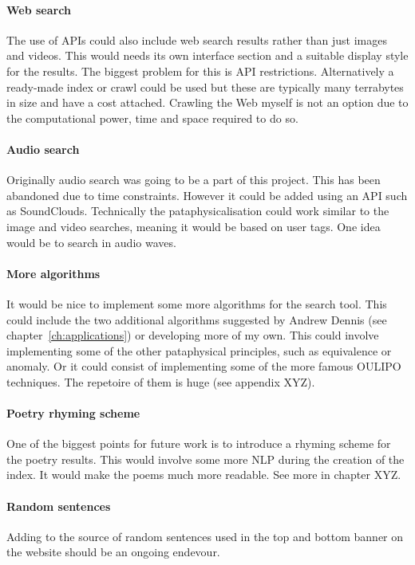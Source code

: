 \paragraph{Web search} 
The use of \ac{API}s could also include web search results rather than just images and videos. This would needs its own interface section and a suitable display style for the results. The biggest problem for this is \ac{API} restrictions. Alternatively a ready-made index or crawl could be used but these are typically many terrabytes in size and have a cost attached. Crawling the Web myself is not an option due to the computational power, time and space required to do so.

\paragraph{Audio search} 
Originally audio search was going to be a part of this project. This has been abandoned due to time constraints. However it could be added using an \ac{API} such as SoundClouds. Technically the pataphysicalisation could work similar to the image and video searches, meaning it would be based on user tags. One idea would be to search in audio waves.

\paragraph{More algorithms} 
It would be nice to implement some more algorithms for the search tool. This could include the two additional algorithms suggested by Andrew Dennis (see chapter~\ref{ch:applications}) or developing more of my own. This could involve implementing some of the other pataphysical principles, such as equivalence or anomaly. Or it could consist of implementing some of the more famous \ac{OULIPO} techniques. The repetoire of them is huge (see appendix XYZ).

\paragraph{Poetry rhyming scheme} 
One of the biggest points for future work is to introduce a rhyming scheme for the poetry results. This would involve some more \ac{NLP} during the creation of the index. It would make the poems much more readable. See more in chapter XYZ.

\paragraph{Random sentences} 
Adding to the source of random sentences used in the top and bottom banner on the website should be an ongoing endevour.

